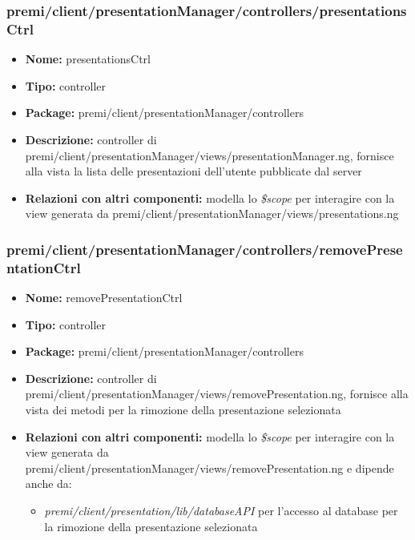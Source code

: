 \subsubsection{premi/client/presentationManager/controllers/presentationsCtrl}
\begin{itemize}
  \item[] \textbf{Nome:} presentationsCtrl
  \item[] \textbf{Tipo:} controller
  \item[] \textbf{Package:} premi/client/presentationManager/controllers
  \item[] \textbf{Descrizione:} controller di premi/client/presentationManager/views/presentationManager.ng, fornisce alla vista la lista delle presentazioni dell'utente pubblicate dal server
  \item[] \textbf{Relazioni con altri componenti:} modella lo \textit{\$scope} per interagire con la view generata da premi/client/presentationManager/views/presentations.ng
\end{itemize}

\subsubsection{premi/client/presentationManager/controllers/removePresentationCtrl}
\begin{itemize}
  \item[] \textbf{Nome:} removePresentationCtrl
  \item[] \textbf{Tipo:} controller
  \item[] \textbf{Package:} premi/client/presentationManager/controllers
  \item[] \textbf{Descrizione:} controller di premi/client/presentationManager/views/removePresentation.ng, fornisce alla vista dei metodi per la rimozione della presentazione selezionata
  \item[] \textbf{Relazioni con altri componenti:} modella lo \textit{\$scope} per interagire con la view generata da premi/client/presentationManager/views/removePresentation.ng e dipende anche da:
 \begin{itemize}
 \item \textit{premi/client/presentation/lib/databaseAPI} per l'accesso al database per la rimozione della presentazione selezionata
\end{itemize}
\end{itemize}



\clearpage
